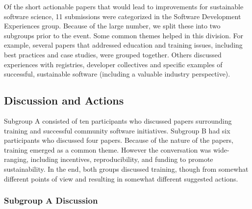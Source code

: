 \documentclass[11pt, oneside]{amsart}
\newcommand{\note}[1]{ {\textcolor{blueish}    { ***Note:      #1 }}}
\begin{document}

Of the short actionable papers that would lead to improvements for sustainable
software science, 11 submissions were categorized in the Software Development
Experiences group. Because of the large number, we split these into two
subgroups prior to the event. Some common themes helped in this division. For
example, several papers that addressed education and training issues, including
best practices and case studies, were grouped together. Others discussed
experiences with registries, developer collectives and specific examples of
successful, sustainable software (including a valuable industry perspective).

\subsection{Discussion and Actions}

Subgroup A consisted of ten participants who discussed papers surrounding training
and successful community software initiatives.
Subgroup B had six participants who discussed four papers. Because of the nature
of the papers, training emerged as a common theme. However the conversation was
wide-ranging, including incentives, reproducibility, and funding to promote
sustainability.  In the end, both groups discussed training, though from somewhat different
points of view and resulting in somewhat different suggested actions.

\subsubsection{Subgroup A Discussion}

\end{document}
